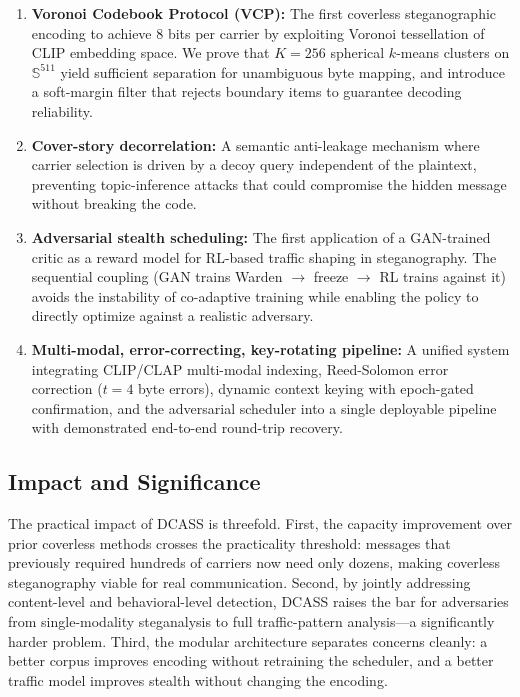 \documentclass[conference]{IEEEtran}
\begin{document}
\begin{enumerate}
    \item \textbf{Voronoi Codebook Protocol (VCP):} The first coverless steganographic encoding to achieve 8 bits per carrier by exploiting Voronoi tessellation of CLIP embedding space. We prove that $K = 256$ spherical $k$-means clusters on $\mathbb{S}^{511}$ yield sufficient separation for unambiguous byte mapping, and introduce a soft-margin filter that rejects boundary items to guarantee decoding reliability.
    \item \textbf{Cover-story decorrelation:} A semantic anti-leakage mechanism where carrier selection is driven by a decoy query independent of the plaintext, preventing topic-inference attacks that could compromise the hidden message without breaking the code.
    \item \textbf{Adversarial stealth scheduling:} The first application of a GAN-trained critic as a reward model for RL-based traffic shaping in steganography. The sequential coupling (GAN trains Warden $\to$ freeze $\to$ RL trains against it) avoids the instability of co-adaptive training while enabling the policy to directly optimize against a realistic adversary.
    \item \textbf{Multi-modal, error-correcting, key-rotating pipeline:} A unified system integrating CLIP/CLAP multi-modal indexing, Reed-Solomon error correction ($t = 4$ byte errors), dynamic context keying with epoch-gated confirmation, and the adversarial scheduler into a single deployable pipeline with demonstrated end-to-end round-trip recovery.
\end{enumerate}

\subsection{Impact and Significance}

The practical impact of DCASS is threefold. First, the capacity improvement over prior coverless methods crosses the practicality threshold: messages that previously required hundreds of carriers now need only dozens, making coverless steganography viable for real communication. Second, by jointly addressing content-level and behavioral-level detection, DCASS raises the bar for adversaries from single-modality steganalysis to full traffic-pattern analysis---a significantly harder problem. Third, the modular architecture separates concerns cleanly: a better corpus improves encoding without retraining the scheduler, and a better traffic model improves stealth without changing the encoding.
\end{document}
